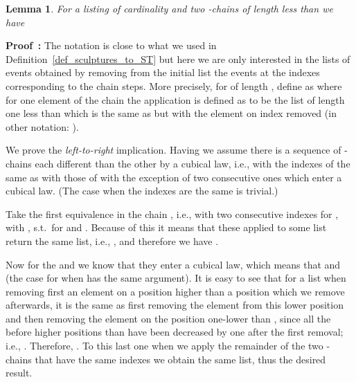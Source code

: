 \documentclass[submission,copyright,creativecommons]{eptcs}
\newtheorem{lemma}[theorem]{Lemma}
\newenvironment{proof}[1][\!\!\,]{\vspace{1ex}\noindent\textbf{Proof #1: }}{\hfill\vspace{2ex}}
\newcounter{case}
\begin{document}
\begin{lemma}\label{lemma_on_scultures_equalEventSets}
For a listing  of cardinality  and two -chains  of length less than  we have

\end{lemma}

\begin{proof}
The notation  is close to what we used in Definition~\ref{def_sculptures_to_ST} but here we are only interested in the lists of events obtained by removing from the initial list  the events at the indexes corresponding to the chain steps. More precisely, for  of length , define  as  where for one element of the chain the application is defined as  to be the list of length one less than  which is the same as  but with the element on index  removed (in other notation: ).

We prove the \textit{left-to-right} implication.
Having  we assume there is a sequence of -chains each different than the other by a cubical law, i.e.,  with the indexes of  the same as with those of  with the exception of two consecutive ones which enter a cubical law.
(The case when the indexes are the same is trivial.)

Take the first equivalence in the chain , i.e.,  with two consecutive indexes for , with , s.t.\  for  and . Because of this it means that these applied to some list  return the same list, i.e., , and therefore we have .

Now for the  and  we know that they enter a cubical law, which means that  and  (the case for when  has the same argument). It is easy to see that for a list  when removing first an element on a position  higher than a position  which we remove afterwards, it is the same as first removing the element from this lower position  and then removing the element on the position one-lower than , since all the before higher positions than  have been decreased by one after the first removal; i.e., . Therefore, . 
To this last one when we apply the remainder of the two -chains that have the same indexes we obtain the same list, thus the desired result.



\end{proof}
\end{document}
